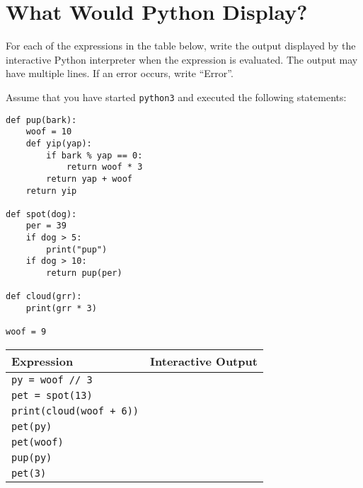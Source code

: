 \documentclass{exam}
\begin{document}
\clearpage

\section{What Would Python Display?}
\begin{questions}
\question For each of the expressions in the table below, write the output displayed by the interactive Python interpreter when the expression is evaluated. The output may have multiple lines. If an error occurs, write ``Error''.

Assume that you have started \texttt{python3} and executed the following statements:

\begin{lstlisting}
def pup(bark):
    woof = 10
    def yip(yap):
        if bark % yap == 0:
            return woof * 3
        return yap + woof
    return yip

def spot(dog):
    per = 39
    if dog > 5:
        print("pup")
    if dog > 10:
        return pup(per)

def cloud(grr):
    print(grr * 3)

woof = 9
\end{lstlisting}
\vspace*{-0.25in}

\ifprintanswers\else
\begin{center}
\begin{tabular}{|m{8cm}|m{6cm}|}
\hline
\textbf{Expression} & \textbf{Interactive Output} \\
\hline
\lstinline$py = woof // 3$ & \\ [2em]
\hline
\lstinline$pet = spot(13)$ & \\ [3em]
\hline
\lstinline$print(cloud(woof + 6))$ & \\ [3em]
\hline
\lstinline$pet(py)$ & \\ [3em]
\hline
\lstinline$pet(woof)$ & \\ [3em]
\hline
\lstinline$pup(py)$ & \\ [3em]
\hline
\lstinline$pet(3)$ & \\ [3em]
\hline
\end{tabular}
\end{center}
\fi


\end{questions}
\end{document}
